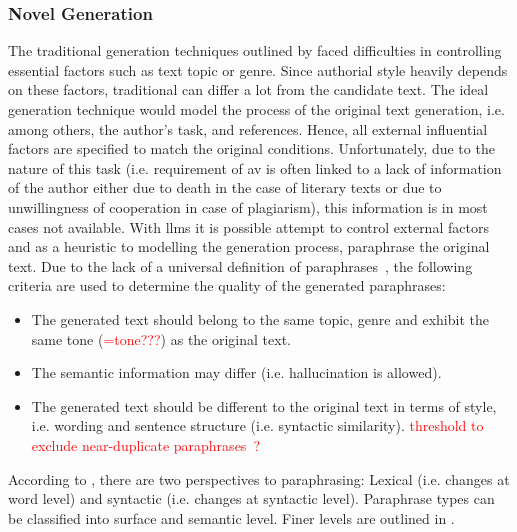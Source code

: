 \subsubsection{Novel \imp{} Generation}
\label{subsubsec:novel_impostor_generation}
The traditional generation techniques outlined by \citet{koppel_determining_2014} faced difficulties in controlling essential factors such as text topic or genre.
Since authorial style heavily depends on these factors, traditional \imps{} can differ a lot from the candidate text.
The ideal generation technique would model the process of the original text generation, 
i.e. among others, the author's task, and references.
Hence, all external influential factors are specified to match the original conditions.
Unfortunately, due to the nature of this task 
(i.e. requirement of \ac{av} is often linked to a lack of information of the author either due to death in the case of literary texts or 
due to unwillingness of cooperation in case of plagiarism), this information is in most cases not available.
With \acp{llm} it is possible attempt to control external factors and 
as a heuristic to modelling the generation process, paraphrase the original text.
Due to the lack of a universal definition of paraphrases~\citep{gohsen_task_oriented_2024}, the following criteria are used to determine the quality of the generated paraphrases:
\begin{itemize}
    \item The generated text should belong to the same topic, genre and exhibit the same tone (\textcolor{red}{=tone???}) as the original text.
    \item The semantic information may differ (i.e. hallucination is allowed).
    \item The generated text should be different to the original text in terms of style, i.e. wording and sentence structure (i.e. syntactic similarity). \textcolor{red}{threshold to exclude near-duplicate paraphrases~\citep{gohsen_captions_2023}?}
\end{itemize}


According to \citet{gohsen_task_oriented_2024}, there are two perspectives to paraphrasing: 
Lexical (i.e. changes at word level) and syntactic (i.e. changes at syntactic level).
Paraphrase types can be classified into surface and semantic level. Finer levels are outlined in \citep{gohsen_task_oriented_2024}.

